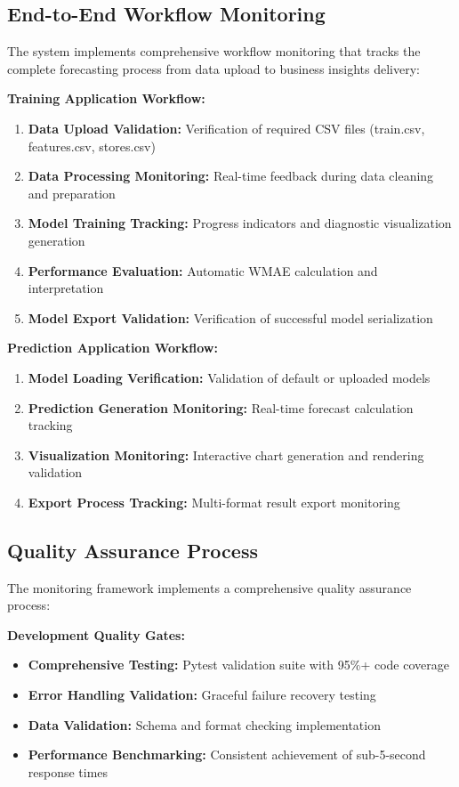 \subsection{End-to-End Workflow Monitoring}

The system implements comprehensive workflow monitoring that tracks the complete forecasting process from data upload to business insights delivery:

\textbf{Training Application Workflow:}
\begin{enumerate}
	\item \textbf{Data Upload Validation:} Verification of required CSV files (train.csv, features.csv, stores.csv)
	\item \textbf{Data Processing Monitoring:} Real-time feedback during data cleaning and preparation
	\item \textbf{Model Training Tracking:} Progress indicators and diagnostic visualization generation
	\item \textbf{Performance Evaluation:} Automatic WMAE calculation and interpretation
	\item \textbf{Model Export Validation:} Verification of successful model serialization
\end{enumerate}

\textbf{Prediction Application Workflow:}
\begin{enumerate}
	\item \textbf{Model Loading Verification:} Validation of default or uploaded models
	\item \textbf{Prediction Generation Monitoring:} Real-time forecast calculation tracking
	\item \textbf{Visualization Monitoring:} Interactive chart generation and rendering validation
	\item \textbf{Export Process Tracking:} Multi-format result export monitoring
\end{enumerate}

\subsection{Quality Assurance Process}

The monitoring framework implements a comprehensive quality assurance process:

\textbf{Development Quality Gates:}
\begin{itemize}
	\item \textbf{Comprehensive Testing:} Pytest validation suite with 95\%+ code coverage
	\item \textbf{Error Handling Validation:} Graceful failure recovery testing
	\item \textbf{Data Validation:} Schema and format checking implementation
	\item \textbf{Performance Benchmarking:} Consistent achievement of sub-5-second response times
\end{itemize}

